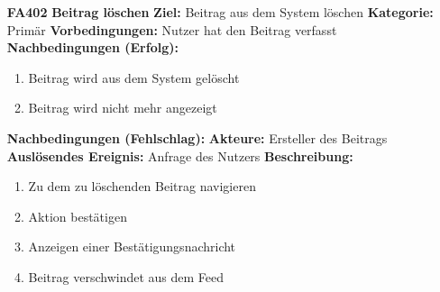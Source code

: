 \documentclass[parskip=full]{scrartcl}
\begin{document}
\begin{itemize}[nosep]
			\item[\textbf{FA402}]\textbf{Beitrag löschen}
			\newline \textbf{Ziel:} Beitrag aus dem System löschen
			\newline \textbf{Kategorie:} Primär
			\newline \textbf{Vorbedingungen:} Nutzer hat den Beitrag verfasst
			\newline \textbf{Nachbedingungen (Erfolg):}
			\begin{enumerate}[nosep]
				\item Beitrag wird aus dem System gelöscht
				\item Beitrag wird nicht mehr angezeigt
			\end{enumerate}
			\textbf{Nachbedingungen (Fehlschlag):}
			\newline \textbf{Akteure:} Ersteller des Beitrags
			\newline \textbf{Auslösendes Ereignis:} Anfrage des Nutzers
			\newline \textbf{Beschreibung:}
			\begin{enumerate}[nosep]
				\item Zu dem zu löschenden Beitrag navigieren
				\item Aktion bestätigen
				\item Anzeigen einer Bestätigungsnachricht
				\item Beitrag verschwindet aus dem \gls{Feed}\\
			\end{enumerate}
			

\end{itemize}
\end{document}
